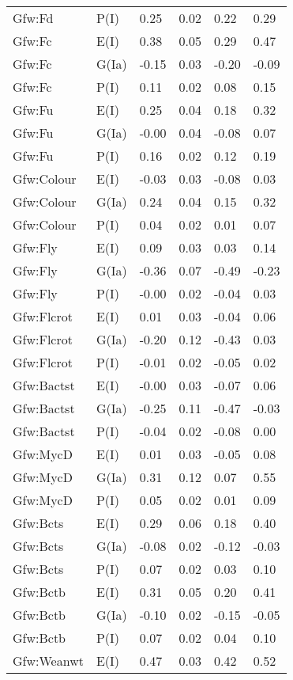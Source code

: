 \begin{center}
\begin{longtable}{|p{1.1in}|p{0.7in}|p{0.7in}|p{0.6in}|p{0.6in}|p{0.6in}|}
  Gfw:Fd & P(I) & 0.25 & 0.02 & 0.22 & 0.29 \\ 
  Gfw:Fc & E(I) & 0.38 & 0.05 & 0.29 & 0.47 \\ 
  Gfw:Fc & G(Ia) & -0.15 & 0.03 & -0.20 & -0.09 \\ 
  Gfw:Fc & P(I) & 0.11 & 0.02 & 0.08 & 0.15 \\ 
  Gfw:Fu & E(I) & 0.25 & 0.04 & 0.18 & 0.32 \\ 
  Gfw:Fu & G(Ia) & -0.00 & 0.04 & -0.08 & 0.07 \\ 
  Gfw:Fu & P(I) & 0.16 & 0.02 & 0.12 & 0.19 \\ 
  Gfw:Colour & E(I) & -0.03 & 0.03 & -0.08 & 0.03 \\ 
  Gfw:Colour & G(Ia) & 0.24 & 0.04 & 0.15 & 0.32 \\ 
  Gfw:Colour & P(I) & 0.04 & 0.02 & 0.01 & 0.07 \\ 
  Gfw:Fly & E(I) & 0.09 & 0.03 & 0.03 & 0.14 \\ 
  Gfw:Fly & G(Ia) & -0.36 & 0.07 & -0.49 & -0.23 \\ 
  Gfw:Fly & P(I) & -0.00 & 0.02 & -0.04 & 0.03 \\ 
  Gfw:Flcrot & E(I) & 0.01 & 0.03 & -0.04 & 0.06 \\ 
  Gfw:Flcrot & G(Ia) & -0.20 & 0.12 & -0.43 & 0.03 \\ 
  Gfw:Flcrot & P(I) & -0.01 & 0.02 & -0.05 & 0.02 \\ 
  Gfw:Bactst & E(I) & -0.00 & 0.03 & -0.07 & 0.06 \\ 
  Gfw:Bactst & G(Ia) & -0.25 & 0.11 & -0.47 & -0.03 \\ 
  Gfw:Bactst & P(I) & -0.04 & 0.02 & -0.08 & 0.00 \\ 
  Gfw:MycD & E(I) & 0.01 & 0.03 & -0.05 & 0.08 \\ 
  Gfw:MycD & G(Ia) & 0.31 & 0.12 & 0.07 & 0.55 \\ 
  Gfw:MycD & P(I) & 0.05 & 0.02 & 0.01 & 0.09 \\ 
  Gfw:Bcts & E(I) & 0.29 & 0.06 & 0.18 & 0.40 \\ 
  Gfw:Bcts & G(Ia) & -0.08 & 0.02 & -0.12 & -0.03 \\ 
  Gfw:Bcts & P(I) & 0.07 & 0.02 & 0.03 & 0.10 \\ 
  Gfw:Bctb & E(I) & 0.31 & 0.05 & 0.20 & 0.41 \\ 
  Gfw:Bctb & G(Ia) & -0.10 & 0.02 & -0.15 & -0.05 \\ 
  Gfw:Bctb & P(I) & 0.07 & 0.02 & 0.04 & 0.10 \\ 
  Gfw:Weanwt & E(I) & 0.47 & 0.03 & 0.42 & 0.52 \\ 

\end{longtable}
\end{center}
